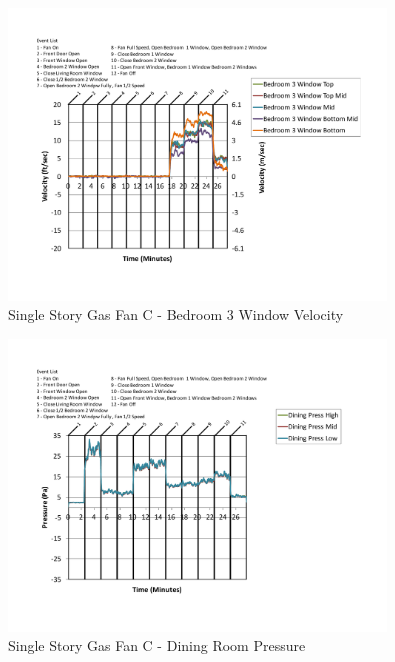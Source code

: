 \documentclass{article}
\begin{document}
\begin{appendices}
	\begin{figure}[H]
		\centering
		\includegraphics[height=3.05in,trim=0.67in 1.1in 0.67in 0.8in,clip=true]{0_Images/Results_Charts/ColdFlow/Single_Story/Gas/C/Bedroom_3_Window_Velocity.pdf}
		\caption{Single Story Gas Fan C - Bedroom 3 Window Velocity}
	\end{figure}
 

	\begin{figure}[H]
		\centering
		\includegraphics[height=3.05in,trim=0.67in 1.1in 0.67in 0.8in,clip=true]{0_Images/Results_Charts/ColdFlow/Single_Story/Gas/C/Dining_Room_Pressure.pdf}
		\caption{Single Story Gas Fan C - Dining Room Pressure}
	\end{figure}
 
	\clearpage


\end{appendices}
\end{document}
